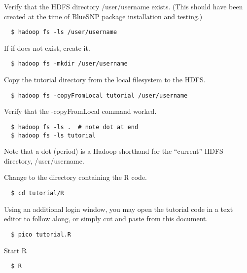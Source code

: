 Verify that the HDFS directory /user/username exists. (This should have been created at the time of BlueSNP package installation and testing.)

\begin{verbatim}
  $ hadoop fs -ls /user/username
\end{verbatim}

If if does not exist, create it.
\begin{verbatim}
  $ hadoop fs -mkdir /user/username
\end{verbatim}

Copy the tutorial directory from the local filesystem to the HDFS.
\begin{verbatim}
  $ hadoop fs -copyFromLocal tutorial /user/username
\end{verbatim}

Verify that the -copyFromLocal command worked.
\begin{verbatim}
  $ hadoop fs -ls .  # note dot at end
  $ hadoop fs -ls tutorial
\end{verbatim}

Note that a dot (period) is a Hadoop shorthand for the ``current'' HDFS directory, /user/username.

Change to the directory containing the R code.
\begin{verbatim}
  $ cd tutorial/R
\end{verbatim}

Using an additional login window, you may open the tutorial code in a text editor to follow along, or simply cut and paste from this document.

\begin{verbatim}
  $ pico tutorial.R
\end{verbatim}

Start R
\begin{verbatim}
  $ R
\end{verbatim}

